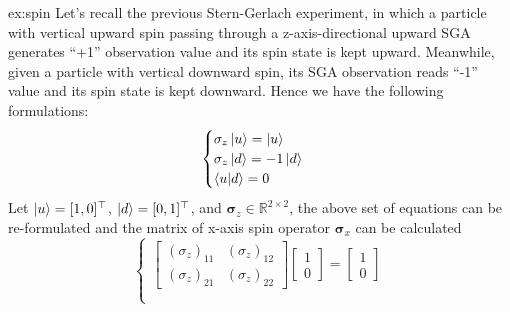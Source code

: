 \documentclass{easyclass}
\begin{document}
\begin{itemize}
	\begin{example}{ex:spin}
		Let's recall the previous Stern-Gerlach experiment, in which a particle with vertical upward spin passing through a z-axis-directional upward SGA generates ``+1'' observation value and its spin state is kept upward. Meanwhile, given a particle with vertical downward spin, its SGA observation reads ``-1'' value and its spin state is kept downward. Hence we have the following formulations:
		\begin{equation}
			\begin{cases}
				\mathbf{\sigma}_z\ket{u} = \ket{u}\\
				\mathbf{\sigma}_z\ket{d} = -1\ket{d}\\
				\braket{u|d} = 0
			\end{cases}
		\end{equation}
		Let $\ket{u}=[1,0]^{\top}$, $\ket{d}=[0,1]^{\top}$, and $\mathbf{\sigma}_z\in\mathbb{R}^{2\times 2}$, the above set of equations can be re-formulated and the matrix of x-axis spin operator $\mathbf{\sigma}_x$ can be calculated
		\begin{equation}
			\begin{cases}
				\begin{bmatrix}
					(\sigma_z)_{11} & (\sigma_z)_{12}\\
					(\sigma_z)_{21} & (\sigma_z)_{22}
				\end{bmatrix} 
				\begin{bmatrix}
					1 \\ 0
				\end{bmatrix}=
				\begin{bmatrix}
					1 \\ 0
				\end{bmatrix}\\\\
				

\end{cases}
\end{equation}
\end{example}
\end{itemize}
\end{document}
